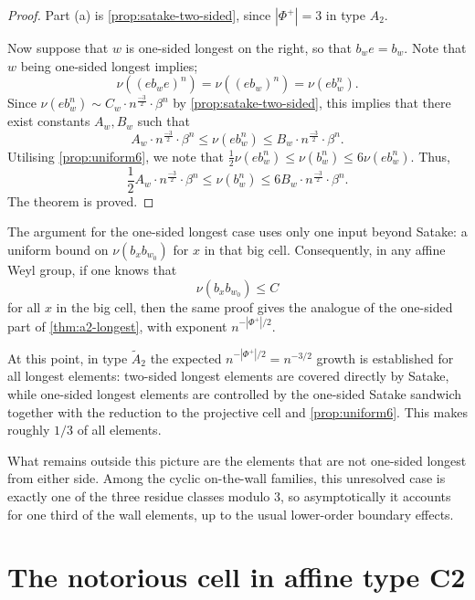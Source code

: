 \documentclass[a4paper,11pt]{amsart}
\newcommand{\wt}{\widetilde}
\newcommand{\nuop}{\nu}
\numberwithin{equation}{subsection}
\theoremstyle{definition}
\theoremstyle{remark}
\begin{document}
\begin{proof}
Part (a) is \autoref{prop:satake-two-sided}, since $|\Phi^+|=3$ in type $A_2$.

Now suppose that $w$ is one-sided longest on the right, so that $b_we=b_w$. Note that $w$ being one-sided longest implies;
\[\nu((eb_we)^n) = \nu((eb_w)^n) = \nu(eb_w^n).\]
Since $\nu(eb_w^n) \sim C_w \cdot n^{\frac{-3}{2}}\cdot \beta^n$ by \autoref{prop:satake-two-sided}, this implies that there exist constants $A_w, B_w$ such that \[A_w \cdot n^{\frac{-3}{2}}\cdot\beta^n \leq \nu(eb_w^n) \leq B_w \cdot n^{\frac{-3}{2}}\cdot\beta^n.\]
Utilising \autoref{prop:uniform6}, we note that $\frac{1}{2}\nu(eb_w^n) \leq \nu(b_w^n) \leq 6\nu(eb_w^n)$. Thus, \[\frac{1}{2}A_w \cdot n^{\frac{-3}{2}}\cdot\beta^n \leq \nu(b_w^n) \leq 6 B_w \cdot n^{\frac{-3}{2}}\cdot\beta^n.\]
The theorem is proved.
\end{proof}

\begin{Remark}
The argument for the one-sided longest case uses only one input beyond Satake: a uniform bound on $\nuop(b_xb_{w_0})$ for $x$ in that big cell.
Consequently, in any affine Weyl group, if one knows that
\[
\nuop(b_xb_{w_0})\le C
\]
for all $x$ in the big cell, then the same proof gives the analogue of the one-sided part of \autoref{thm:a2-longest}, with exponent $n^{-|\Phi^+|/2}$.
\end{Remark}

\begin{Remark}
At this point, in type $\wt A_2$ the expected $n^{-|\Phi^+|/2}=n^{-3/2}$ growth is established for all longest elements:
two-sided longest elements are covered directly by Satake, while one-sided longest elements are controlled by the one-sided Satake sandwich together with the reduction to the projective cell and \autoref{prop:uniform6}. This makes roughly $1/3$ of all elements.

What remains outside this picture are the elements that are not one-sided longest from either side.
Among the cyclic on-the-wall families, this unresolved case is exactly one of the three residue classes modulo $3$, so asymptotically it accounts for one third of the wall elements, up to the usual lower-order boundary effects.
\end{Remark}

\section{The notorious cell in affine type C2}\label{S:C2}
\end{document}
